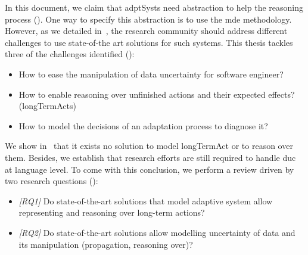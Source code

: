 In this document, we claim that \glspl{adptSyst} need abstraction to help the reasoning process (\cf {}).
One way to specify this abstraction is to use the \gls{mde} methodology.
However, as we detailed in~, the research community should address different challenges to use state-of-the art solutions for such systems.
This thesis tackles three of the challenges identified (\cf {}):
\begin{itemize}
	\item How to ease the manipulation of data uncertainty for software engineer?
	\item How to enable reasoning over unfinished actions and their expected effects? (\glspl{longTermAct})
	\item How to model the decisions of an adaptation process to diagnose it?
\end{itemize}

We show in~ that it exists no solution to model \gls{longTermAct} or to reason over them.
Besides, we establish that research efforts are still required to handle \gls{duc} at language level.
To come with this conclusion, we perform a review driven by two research questions (\cf {}):
\begin{itemize}
	\item \textit{[RQ1]} Do state-of-the-art solutions that model adaptive system allow representing and reasoning over long-term actions?
	\item \textit{[RQ2]} Do state-of-the-art solutions allow modelling uncertainty of data and its manipulation (propagation, reasoning over)?
\end{itemize}

